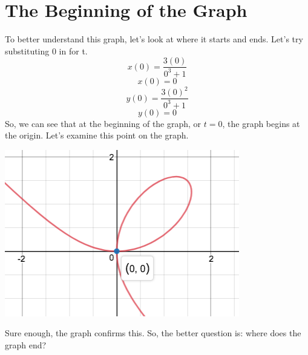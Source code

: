 \documentclass[a4paper,openright, 10pt]{article}
\begin{document}
\section*{The Beginning of the Graph}
To better understand this graph, let's look at where it starts and ends. Let's try substituting 0 in for t.
$$x(0)=\frac{3(0)}{0^3+1}$$
$$x(0)=0$$
$$y(0)=\frac{3(0)^2}{0^3+1}$$
$$y(0)=0$$
So, we can see that at the beginning of the graph, or $t=0$, the graph begins at the origin. Let's examine this point on the graph.
\begin{center}
    \includegraphics[scale=0.5]{graph2}
\end{center}
Sure enough, the graph confirms this. So, the better question is: where does the graph end?
\end{document}
